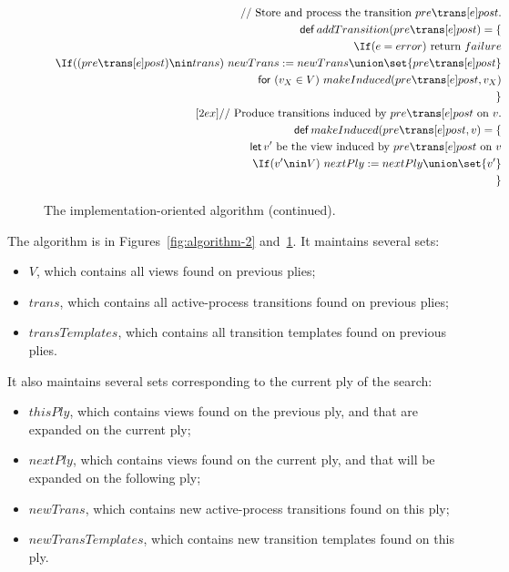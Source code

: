 
\begin{figure}
\[
\begin{align}
\comment{Store and process the transition $pre \trans[e] post$.} \\
\Def addTransition(pre \trans[e] post) = \{ \\
\quad  \If (e = error)\ \mbox{return $failure$} \\
\quad \If ((pre \trans[e] post) \nin trans)\ 
        newTrans := newTrans \union \set{pre \trans[e] post} \\
\quad \For (v_X \in V)\ makeInduced(pre \trans[e] post, v_X) \\
\} 
\\ [2ex]
\comment{Produce transitions induced by $pre \trans[e] post$ on~$v$.} \\
\Def makeInduced(pre \trans[e] post, v) = \{ \\
\quad \Let v' \mbox{ be the view induced by $pre \trans[e] post$ on $v$} \\
\quad \If (v' \nin V)\ nextPly := nextPly \union \set{v'} \\
\} 
\end{align}
\]
\caption{The implementation-oriented algorithm (continued).}
\label{fig:algorithm-3}
\end{figure}


The algorithm is in Figures~\ref{fig:algorithm-2} and~\ref{fig:algorithm-3}.
It maintains several sets:
%
\begin{itemize}
\item $V$, which contains all views found on previous plies;

\item $trans$, which contains all active-process transitions found on previous
  plies;

\item $transTemplates$, which contains all transition templates found on
  previous plies.
\end{itemize}
%
It also maintains several sets corresponding to the current ply of the search:
%
\begin{itemize}
\item $thisPly$, which contains views found on the previous ply, and that are
  expanded on the current ply;

\item $nextPly$, which contains views found on the current ply, and that will
  be expanded on the following ply;

\item $newTrans$, which contains new active-process transitions found on this
  ply;

\item $newTransTemplates$, which contains new transition templates found on
  this ply.
\end{itemize}

